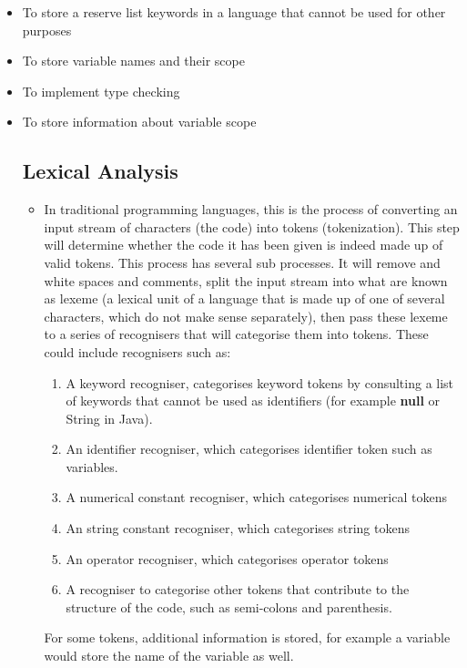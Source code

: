 \documentclass[ %
                    author={Jonathan Rankin},
                supervisor={Dr. David May, Dr. Ian Holyer},
                    degree={MEng},
                     title={CodeTouch},
                  subtitle={A Revolutionary Way To Program Real Code On Touch Screen Devices},
                      type={enterprise},
                      year={2015 } ]{dissertation}
\begin{document}
\begin{itemize}
\item To store a reserve list keywords in a language that cannot be used for other purposes
\item To store variable names and their scope
\item To implement type checking
\item To store information about variable scope

\subsection{Lexical Analysis}

\begin{itemize}
\item[]
In traditional programming languages, this is the process of converting an input stream of characters (the code) into tokens (tokenization). This step will determine whether the code it has been given is indeed made up of valid tokens. This process has several sub processes. It will remove and white spaces and comments, split the input stream into what are known as lexeme (a lexical unit of a language that is made up of one of several characters, which do not make sense separately), then pass these lexeme to a series of recognisers that will categorise them into tokens. These could include recognisers such as:

\begin{enumerate}
\item A keyword recogniser, categorises keyword tokens by consulting a list of keywords that cannot be used as identifiers (for example \textbf{null} or {String} in Java). 
\item An identifier recogniser, which categorises identifier token such as variables. 
\item A numerical constant recogniser, which categorises numerical tokens
\item An string constant recogniser, which categorises string tokens
\item An operator recogniser, which categorises operator tokens
\item A recogniser to categorise other tokens that contribute to the structure  of the code, such as semi-colons and parenthesis.
\end{enumerate}


For some tokens, additional information is stored, for example a variable would store the name of the variable as well. 


\end{itemize}
\end{itemize}
\end{document}
